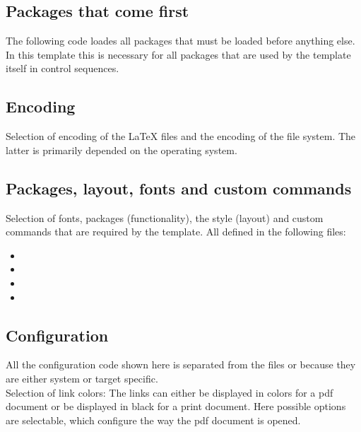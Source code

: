 \subsection{Packages that come first}
The following code loades all packages that must be loaded before anything else. In this template this is necessary for all packages that are used by the template itself in control sequences.

\subsection{Encoding}
Selection of encoding of the LaTeX files and the encoding of the file system. The latter is primarily depended on the operating system.

\subsection{Packages, layout, fonts and custom commands}
Selection of fonts, packages (functionality), the style (layout) and custom 
commands that are required by the template. All defined in the following files:
%
\begin{itemize}[noitemsep]
\item {}
\item {}
\item {}
\item {}
\end{itemize}


\subsection{Configuration}
\label{sec:main:Configuration}
All the configuration code shown here is separated from the files  or  because they are either system or target specific.
\medskip\\\noindent
%
Selection of link colors: The links can either be displayed in colors for a pdf document or be displayed in black for a print document.
%
Here possible options are selectable, which configure the way the pdf document is opened.

